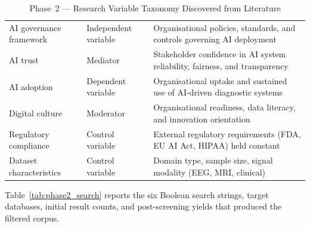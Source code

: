 \begingroup\singlespacing\tablefontsize\tablestripes
\begin{xltabular}{\textwidth}{@{} l l X @{}}
\caption{Phase~2 --- Research Variable Taxonomy Discovered from Literature}
\label{tab:phase2_variables}\\
\toprule
{} &  &  \\
\midrule
\endfirsthead
\endhead
\bottomrule
\endlastfoot
AI governance framework         & Independent variable  & Organisational policies, standards, and controls governing AI deployment \citep{jobin2019ethics} \\
\addlinespace
AI trust                        & Mediator              & Stakeholder confidence in AI system reliability, fairness, and transparency \\
\addlinespace
AI adoption                     & Dependent variable    & Organisational uptake and sustained use of AI-driven diagnostic systems \\
\addlinespace
Digital culture                 & Moderator             & Organisational readiness, data literacy, and innovation orientation \\
\addlinespace
Regulatory compliance           & Control variable      & External regulatory requirements (FDA, EU AI Act, HIPAA) held constant \\
\addlinespace
Dataset characteristics         & Control variable      & Domain type, sample size, signal modality (EEG, MRI, clinical) \\
\end{xltabular}
\endgroup

\vspace{1.5em}

Table~\ref{tab:phase2_search} reports the six Boolean search strings, target databases, initial result counts, and post-screening yields that produced the filtered corpus.


